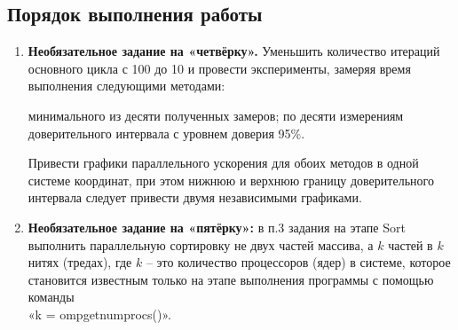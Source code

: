 { %
	\subsection{Порядок выполнения работы}
	\begin{enumerate}
		 программе, полученной в результате выполнения ЛР-3, так изменить этап Generate, чтобы генерируемый набор случайных чисел не зависел от количества потоков, выполняющих программу. Например, на каждой итерации $i$ перед вызовом rand\textunderscore r можно вызывать функцию srand(f(i)), где f – произвольно выбранная функция. Можно придумать и использовать любой другой способ.
		 вызовы функции gettimeofday на omp\textunderscore get\textunderscore wtime.
		 вычисления на этапе Sort, для чего выполнить сортировку в два этапа: 
			\begin{itemize}
				 первую и вторую половину массива в двух независимых нитях (можно использовать OpenMP-директиву ''parallel sections''); 
				 отсортированные половины в единый массив.
			\end{itemize}
		 функцию, которая один раз в секунду выводит в консоль сообщение о текущем проценте завершения работы программы. Указанную функцию необходимо запустить в отдельном потоке, параллельно работающем с основным вычислительным циклом.
		 прямую совместимость (forward compatibility) написанной параллельной программы. Для этого все вызываемые функции вида «omp\textunderscore *» можно условно переопределить в препроцессорных директивах, например, так:
			\begin{figure}[H]
				\texttt{[image: lab4Example]}
			\end{figure}
		 эксперименты, варьируя $N$ от $min(\frac{N_x}{2},\;N_1)$ до $N_2$, где значения $N_1$ и $N_2$ взять из ЛР-1, а $N_x$ – это такое значение $N$, при котором накладные расходы на распараллеливание превышают выигрыш от распараллеливания. Написать отчёт о проделанной работе. Подготовиться к устным вопросам на защите.
		\item\textbf{Необязательное задание на «четвёрку».} Уменьшить количество итераций основного цикла с 100 до 10 и провести эксперименты, замеряя время выполнения следующими методами: 
			\begin{itemize}
				 минимального из десяти полученных замеров; 
				 по десяти измерениям доверительного интервала с уровнем доверия 95\%.
			\end{itemize}
			Привести графики параллельного ускорения для обоих методов в одной системе координат, при этом нижнюю и верхнюю границу доверительного интервала следует привести двумя независимыми графиками.
		\item\textbf{Необязательное задание на «пятёрку»:} в п.3 задания на этапе Sort выполнить параллельную сортировку не двух частей массива, а $k$ частей в $k$ нитях (тредах), где $k$ – это количество процессоров (ядер) в системе, которое становится известным только на этапе выполнения программы с помощью команды \\«k = omp\textunderscore get\textunderscore num\textunderscore procs()».
	\end{enumerate}
}